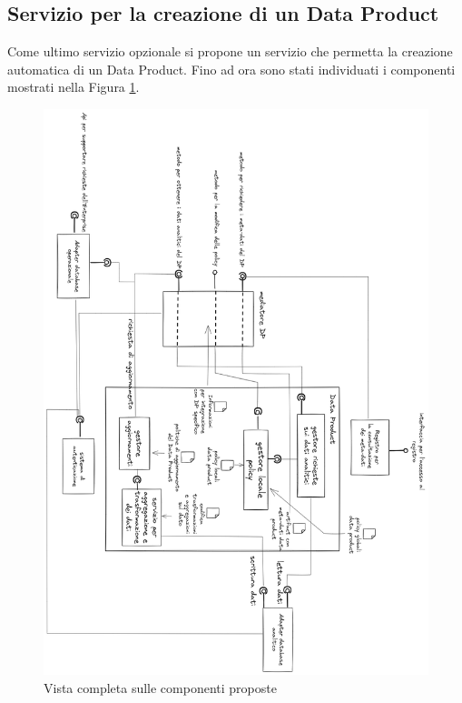 \documentclass[a4paper,12pt]{report}
\begin{document}
\subsection{Servizio per la creazione di un Data Product}
Come ultimo servizio opzionale si propone un servizio che permetta la creazione automatica di un Data Product.
Fino ad ora sono stati individuati i componenti mostrati nella Figura \ref{fig:architettura completa}.
\begin{figure}[]
    \centering
    \includegraphics[width=\linewidth]{immagini/disegno completo architettura 2024-03-12 18.03.16.excalidraw.png}
    \caption{Vista completa sulle componenti proposte}
    \label{fig:architettura completa}
\end{figure}
\end{document}
